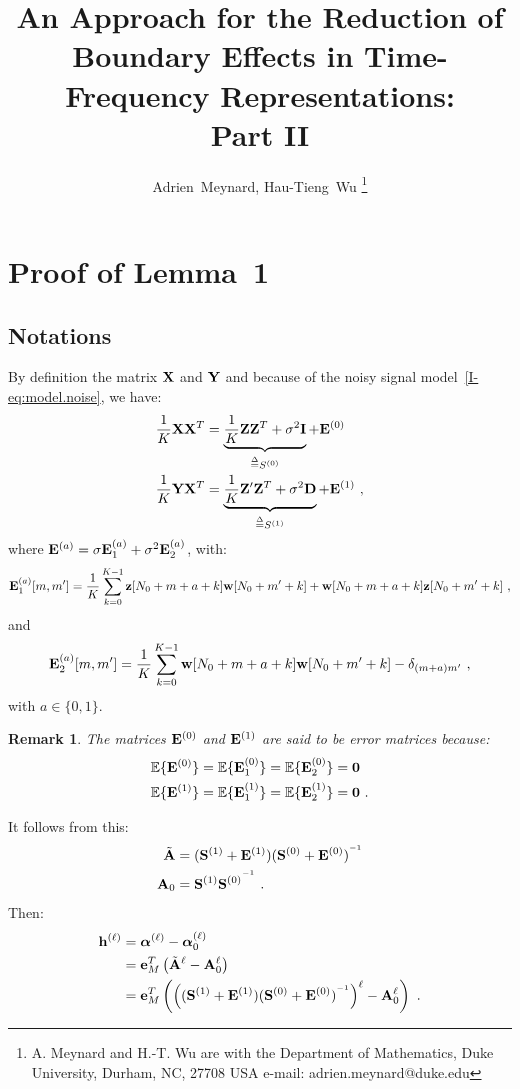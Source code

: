 \documentclass[journal,onecolumn]{IEEEtran}
\title{An Approach for the Reduction of Boundary Effects in Time-Frequency Representations:\\ Part II}
\author{Adrien~Meynard, %
        Hau-Tieng~Wu
\thanks{A. Meynard and H.-T. Wu are with the Department
of Mathematics, Duke University, Durham,
NC, 27708 USA e-mail: adrien.meynard@duke.edu}}
\newtheorem{remark}{Remark}
\begin{document}
\maketitle


\section{Proof of Lemma~1}
\label{ap:lm.error}

\subsection{Notations}
By definition the matrix ${\mathbf X}$ and ${\mathbf Y}$ and because of the noisy signal model~\eqref{I-eq:model.noise}, we have:
\begin{align}
\dfrac1K{\mathbf X}{\mathbf X}^T &= \underbrace{\dfrac1K{\mathbf Z}{\mathbf Z}^T+\sigma^2{\mathbf I}}_{\overset{\Delta}{=} S^{(0)}} + {\mathbf E}^{(0)} \\
\dfrac1K{\mathbf Y}{\mathbf X}^T &= \underbrace{\dfrac1K{\mathbf Z}'{\mathbf Z}^T +\sigma^2{\mathbf D}}_{\overset{\Delta}{=} S^{(1)}}+ {\mathbf E}^{(1)} \ ,
\end{align}
where ${\mathbf E}^{(a)} = \sigma{\mathbf E}_1^{(a)} + \sigma^2{\mathbf E}_2^{(a)}$, with:
\[
{\mathbf E}_1^{(a)}[m,m'] = \dfrac1K\sum_{k=0}^{K-1} {\mathbf z}[N_0+m+a+k]{\mathbf w}[N_0+m'+k] + {\mathbf w}[N_0+m+a+k]{\mathbf z}[N_0+m'+k]\ ,
\]
and
\[
{\mathbf E}_2^{(a)}[m,m'] =  \dfrac1K\sum_{k=0}^{K-1} {\mathbf w}[N_0+m+a+k]{\mathbf w}[N_0+m'+k] - \delta_{(m+a)m'}\ ,
\]
with $a\in\{0,1\}$.

\begin{remark}
The matrices ${\mathbf E}^{(0)}$ and ${\mathbf E}^{(1)}$ are said to be error matrices because:
\begin{align*}
{\mathbb E}\{{\mathbf E}^{(0)}\} &= {\mathbb E}\{{\mathbf E}_1^{(0)}\} = {\mathbb E}\{{\mathbf E}_2^{(0)}\} = \boldsymbol{0} \\
{\mathbb E}\{{\mathbf E}^{(1)}\} &= {\mathbb E}\{{\mathbf E}_1^{(1)}\} = {\mathbb E}\{{\mathbf E}_2^{(1)}\} = \boldsymbol{0}\ .
\end{align*}
\end{remark}

It follows from this:
\begin{align*}
\tilde{{\mathbf A}} &= ({\mathbf S}^{(1)}+{\mathbf E}^{(1)})({\mathbf S}^{(0)}+{\mathbf E}^{(0)})^{^{-1}} \\
{\mathbf A}_0 &={\mathbf S}^{(1)}{{\mathbf S}^{(0)}}^{^{-1}}\ .
\end{align*}
Then:
\begin{align}
\nonumber
\bh^{(\ell)} &= \balpha^{(\ell)} - \balpha^{(\ell)}_0 \\
\nonumber
&= \be_M^T\left(\tilde\bA^\ell-\bA_0^\ell\right) \\
&= \be_M^T\left(\left((\bS^{(1)}+\bE^{(1)})(\bS^{(0)}+\bE^{(0)})^\inv\right)^\ell- \bA_0^\ell\right)\ .
\label{eq:error.vec}
\end{align}
\end{document}
